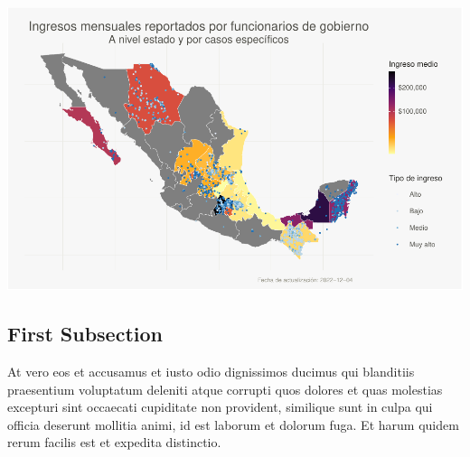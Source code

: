 \documentclass[10,a4paperpaper,]{article}
\begin{document}
\includegraphics{report_files/figure-latex/unnamed-chunk-4-1.pdf}

\subsection{First Subsection}

At vero eos et accusamus et iusto odio dignissimos ducimus qui
blanditiis praesentium voluptatum deleniti atque corrupti quos dolores
et quas molestias excepturi sint occaecati cupiditate non provident,
similique sunt in culpa qui officia deserunt mollitia animi, id est
laborum et dolorum fuga. Et harum quidem rerum facilis est et expedita
distinctio.
\end{document}
